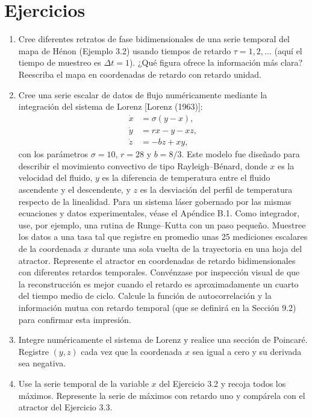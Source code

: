 \documentclass[10pt,a4paper]{book}
\begin{document}
\newpage

\section{Ejercicios}

\begin{enumerate}
	\item Cree diferentes retratos de fase bidimensionales de una serie temporal del mapa de Hénon (Ejemplo 3.2) usando tiempos de retardo $\tau = 1, 2, \ldots$ (aquí el tiempo de muestreo es $\Delta t = 1$). ¿Qué figura ofrece la información más clara? Reescriba el mapa en coordenadas de retardo con retardo unidad.

\newpage

	\item Cree una serie escalar de datos de flujo numéricamente mediante la integración del sistema de Lorenz [Lorenz (1963)]:
	\begin{equation}
		\begin{aligned}
			\dot{x} &= \sigma (y - x),\\
			\dot{y} &= r x - y - x z,\\
			\dot{z} &= - b z + x y,
		\end{aligned}
	\end{equation}
	con los parámetros $\sigma = 10$, $r = 28$ y $b = 8/3$. Este modelo fue diseñado para describir el movimiento convectivo de tipo Rayleigh–Bénard, donde $x$ es la velocidad del fluido, $y$ es la diferencia de temperatura entre el fluido ascendente y el descendente, y $z$ es la desviación del perfil de temperatura respecto de la linealidad. Para un sistema láser gobernado por las mismas ecuaciones y datos experimentales, véase el Apéndice B.1. Como integrador, use, por ejemplo, una rutina de Runge–Kutta con un paso pequeño. Muestree los datos a una tasa tal que registre en promedio unas 25 mediciones escalares de la coordenada $x$ durante una sola vuelta de la trayectoria en una hoja del atractor. Represente el atractor en coordenadas de retardo bidimensionales con diferentes retardos temporales. Convénzase por inspección visual de que la reconstrucción es mejor cuando el retardo es aproximadamente un cuarto del tiempo medio de ciclo. Calcule la función de autocorrelación y la información mutua con retardo temporal (que se definirá en la Sección 9.2) para confirmar esta impresión.

\newpage

	\item Integre numéricamente el sistema de Lorenz y realice una sección de Poincaré. Registre $(y,z)$ cada vez que la coordenada $x$ sea igual a cero y su derivada sea negativa.

\newpage

	\item Use la serie temporal de la variable $x$ del Ejercicio 3.2 y recoja todos los 	máximos. Represente la serie de máximos con retardo uno y compárela con el atractor del Ejercicio 3.3.
\end{enumerate}
\end{document}
